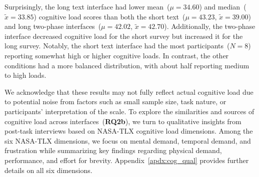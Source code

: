 
Surprisingly, the long text interface had lower mean~($\mu=34.60$) and median~($\tilde{x}=33.85$) cognitive load scores than both the short text~($\mu=43.23$, $\tilde{x}=39.00$) and long two-phase interfaces~($\mu=42.02$, $\tilde{x}=42.70$). Additionally, the two-phase interface decreased cognitive load for the short survey but increased it for the long survey. Notably, the short text interface had the most participants~($N=8$) reporting somewhat high or higher cognitive loads. In contrast, the other conditions had a more balanced distribution, with about half reporting medium to high loads.

We acknowledge that these results may not fully reflect actual cognitive load due to potential noise from factors such as small sample size, task nature, or participants' interpretation of the scale. To explore the similarities and sources of cognitive load across interfaces~(\textbf{RQ2b}), we turn to qualitative insights from post-task interviews based on NASA-TLX cognitive load dimensions. Among the six NASA-TLX dimensions, we focus on mental demand, temporal demand, and frustration while summarizing key findings regarding physical demand, performance, and effort for brevity. Appendix~\ref{apdx:cog_qual} provides further details on all six dimensions.

